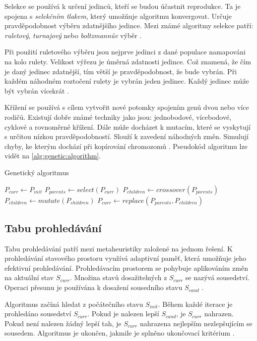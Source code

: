 Selekce se používá k určení jedinců, kteří se budou účastnit reprodukce.
Ta je spojena s \textit{selekčním tlakem}, který umožňuje algoritmu konvergovat.
Určuje pravděpodobnost výběru zdatnějšího jedince.
Mezi známé algoritmy selekce patří: \textit{ruletový}, \textit{turnajový} nebo \textit{boltzmannův} výběr \cite{katoch}.

Při použití ruletového výběru jsou nejprve jedinci z dané populace namapováni na kolo rulety.
Velikost výřezu je úměrná zdatnosti jedince.
Což znamená, že čím je daný jedinec zdatnější, tím větší je pravděpodobnost, že bude vybrán.
Při každém náhodném roztočení rulety je vybrán jeden jedinec.
Každý jedinec může být vybrán vícekrát \cite{katoch}.

Křížení se používá s cílem vytvořit nové potomky spojením genů dvou nebo více rodičů.
Existují dobře známé techniky jako jsou: jednobodové, vícebodové, cyklové a rovnoměrné křížení.
Dále může docházet k mutacím, které se vyskytují s určitou nízkou pravděpodobností.
Slouží k zavedení náhodných změn.
Simulují chyby, ke kterým dochází při kopírování chromozomů \cite{katoch}.
Pseudokód algoritmu lze vidět na \ref{alg:genetic:algorithm}.

\begin{algorithm}
\caption{Genetický algoritmus}\label{alg:genetic:algorithm}
\begin{algorithmic}
\State $P_{curr} \gets P_{init}$
    \State $P_{parents} \gets select(P_{curr})$
    \State $P_{children} \gets crossover(P_{parents})$
    \State $P_{children} \gets mutate(P_{children})$
    \State $P_{curr} \gets replace(P_{parents}, P_{children})$
\EndWhile
\State {}
\end{algorithmic}
\end{algorithm}

\subsection{Tabu prohledávání}
Tabu prohledávání patří mezi metaheuristiky založené na jednom řešení.
K prohledávání stavového prostoru využívá adaptivní paměť, která umožňuje jeho efektivní prohledávání.
Prohledávacím prostorem se pohybuje aplikováním změn na aktuální stav $S_{curr}$.
Množina stavů dosažitelných z $S_{curr}$ se nazývá sousedství.
Operaci přesunu je používána k dosažení sousedního stavu $S_{cand}$ \cite{laguna}.

Algoritmus začíná hledat z počátečního stavu $S_{init}$.
Během každé iterace je prohledáno sousedství $S_{curr}$.
Pokud je nalezen lepší $S_{cand}$, je $S_{curr}$ nahrazen.
Pokud není nalezen žádný lepší tah, je $S_{curr}$ nahrazena nejlepším nezlepšujícím se sousedem.
Algoritmus je ukončen, jakmile je splněno ukončovací kritérium \cite{laguna}.

